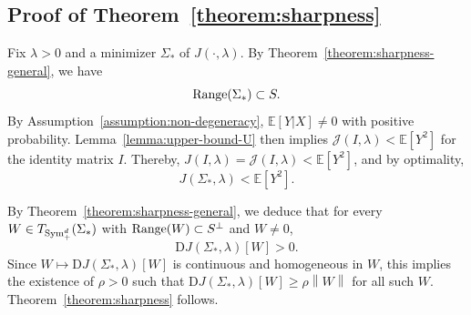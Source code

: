 \documentclass[sn-mathphys-num]{sn-jnl}%
\numberwithin{equation}{section}
\newcommand{\E}{\mathbb{E}}
\newcommand{\norm}[1]{\left\|{#1}\right\|} %
\newcommand{\Range}{{\rm Range}}
\newcommand{\grad}{\nabla}
\newcommand{\Sym}{{\rm \mathrm{Sym}}}
\theoremstyle{thmstyleone}%
\theoremstyle{thmstyletwo}%
\theoremstyle{thmstylethree}%
\begin{document}
\subsection{Proof of Theorem~\ref{theorem:sharpness}}
Fix $\lambda > 0$ and a minimizer $\Sigma_*$ of $J(\cdot,\lambda)$.
By Theorem~\ref{theorem:sharpness-general}, we have 
\begin{equation*}
	\Range(\Sigma_*) \subset S. 
\end{equation*}
By Assumption~\ref{assumption:non-degeneracy}, $\E[Y|X] \neq 0$ with positive probability. 
Lemma~\ref{lemma:upper-bound-U} then implies $\mathcal{J}(I,\lambda) < \E[Y^2]$ for the identity matrix $I$.  Thereby, 
$J(I,\lambda)=\mathcal{J}(I,\lambda) < \E[Y^2]$, and by optimality, 
\begin{equation*}
	J(\Sigma_*, \lambda) < \E[Y^2].
\end{equation*} 

By Theorem~\ref{theorem:sharpness-general}, we deduce that for every $W \in T_{\Sym_+^d}(\Sigma_*)$ with $\Range(W) \subset S^\perp$ and $W \neq 0$, 
\begin{equation}
	\mathrm{D} J(\Sigma_*, \lambda)[W] > 0.
\end{equation}
Since $W \mapsto \mathrm{D}J(\Sigma_*,\lambda)[W]$ is continuous and homogeneous in $W$, this implies the existence of $\rho > 0$ such that 
$\mathrm{D} J(\Sigma_*, \lambda)[W] \ge \rho \norm{W}$ for all such $W$. Theorem~\ref{theorem:sharpness} follows. 








\end{document}
